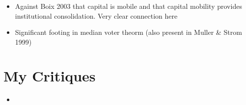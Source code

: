 \documentclass[12pt]{article}
\begin{document}
\begin{itemize}
    \item Against Boix 2003 that capital is mobile and that capital mobility provides institutional consolidation. Very clear connection here
    \item Significant footing in median voter theorm (also present in Muller \& Strom 1999)
\end{itemize}


\section{My Critiques}

\begin{itemize}
    \item
\end{itemize}
\end{document}
